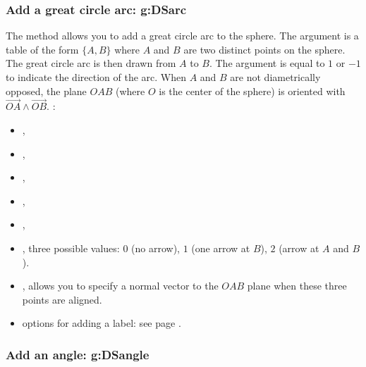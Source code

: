 \subsubsection{Add a great circle arc: g:DSarc}

The method  allows you to add a great circle arc to the sphere. The argument  is a table of the form $\{A,B\}$ where $A$ and $B$ are two distinct points on the sphere. The great circle arc is then drawn from $A$ to $B$. The argument  is equal to $1$ or $-1$ to indicate the direction of the arc. When $A$ and $B$ are not diametrically opposed, the plane $OAB$ (where $O$ is the center of the sphere) is oriented with $\vec{OA}\wedge\vec{OB}$. \writeoptions:
\begin{itemize}
    \item {},
    \item {},
    \item {},
    \item {},
    \item {},
    \item {}, three possible values: $0$ (no arrow), $1$ (one arrow at $B$), $2$ (arrow at $A$ and $B$).
    \item {}, allows you to specify a normal vector to the $OAB$ plane when these three points are aligned.
    \item options for adding a label: see page \pageref{addlabel}.
\end{itemize}

\subsubsection{Add an angle: g:DSangle}

